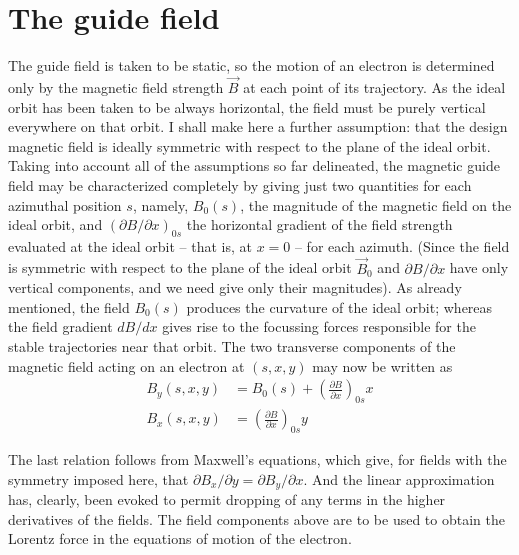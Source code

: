 \section{The guide field}\label{sec:2.2}
The guide field is taken to be static, so the motion of an electron is determined only by the magnetic field strength $\vec{B}$ at each point of its trajectory. As the ideal orbit has been taken to be always horizontal, the field must be purely vertical everywhere on that orbit. I shall make here a further assumption: that the design magnetic field is ideally symmetric with respect to the plane of the ideal orbit.
Taking into account all of the assumptions so far delineated, the magnetic guide field may be characterized completely by giving just two quantities for each azimuthal position $s$, namely, $B_0(s)$, the magnitude of the magnetic field on the ideal orbit, and $(\partial B/\partial x)_{0s}$ the horizontal gradient of the field strength evaluated at the ideal orbit -- that is, at $x = 0$ -- for each azimuth. (Since the field is symmetric with respect to the plane of the ideal orbit $\vec{B}_0$ and $\partial B/\partial x$ have only vertical components, and we need give only their magnitudes). As already mentioned, the field $B_0(s)$ produces the curvature of the ideal orbit; whereas the field gradient $dB/dx$ gives rise to the focussing forces responsible for the stable trajectories near that orbit. The two transverse components of the magnetic field acting on an electron at $(s, x, y)$ may now be written as
\begin{align}
	B_y(s,x,y) &= B_0(s) + \left(\frac{\partial B}{\partial x}\right)_{0s} x\label{eq:2.1}\\
	B_x(s,x,y) &= \left(\frac{\partial B}{\partial x}\right)_{0s} y\label{eq:2.2}
\end{align}

The last relation follows from Maxwell’s equations, which give, for fields with the symmetry imposed here, that $\partial B_x/\partial y = \partial B_y/\partial x$. And the linear approximation has, clearly, been evoked to permit dropping of any terms in the higher derivatives of the fields. The field components above are to be used to obtain the Lorentz force in the equations of motion of the electron.

